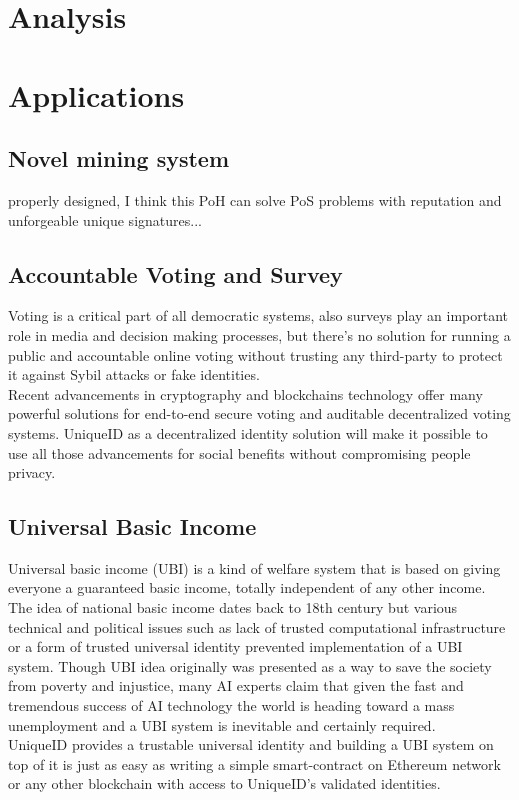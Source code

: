 \documentclass{article}
\begin{document}
\section{Analysis}

 
\section{Applications}

\subsection{Novel mining system}
properly designed, I think this PoH can solve PoS problems with reputation and unforgeable unique signatures...

\subsection{Accountable Voting and Survey}
Voting is a critical part of all democratic systems, also surveys play an important role in media and decision making processes, but there's no solution for running a public and accountable online voting without trusting any third-party to protect it against Sybil attacks or fake identities.\\
Recent advancements in cryptography and blockchains technology offer many powerful solutions for end-to-end secure voting and auditable decentralized voting systems. UniqueID as a decentralized identity solution will make it possible to use all those advancements for social benefits without compromising people privacy.

\subsection{Universal Basic Income}
Universal basic income (UBI) is a kind of welfare system that is based on giving everyone a guaranteed basic income, totally independent of any other income. The idea of national basic income dates back to 18th century but various technical and political issues such as lack of trusted computational infrastructure or a form of trusted universal identity prevented implementation of a UBI system. Though UBI idea originally was presented as a way to save the society from poverty and injustice, many AI experts claim that given the fast and tremendous success of AI technology the world is heading toward a mass unemployment and a UBI system is inevitable and certainly required.\\
UniqueID provides a trustable universal identity and building a UBI system on top of it is just as easy as writing a simple smart-contract on Ethereum network or any other blockchain with access to UniqueID's validated identities. 
\end{document}
